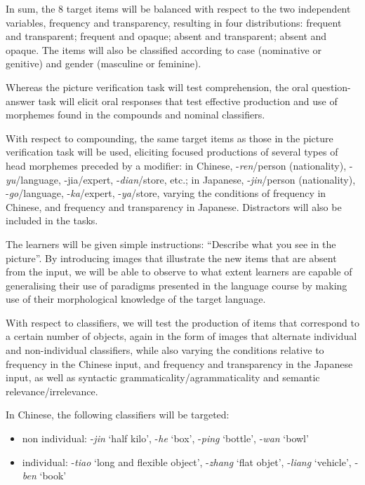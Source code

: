 \documentclass[output=paper,colorlinks,citecolor=brown,modfonts,nonflat]{../langscibook}
\begin{document}
In sum, the 8 target items will be balanced with respect to the two independent variables, frequency and transparency, resulting in four distributions: frequent and transparent; frequent and opaque; absent and transparent; absent and opaque. The items will also be classified according to case (nominative or genitive) and gender (masculine or feminine). 

\label{sec:watorek:4.2.3.2}

Whereas the picture verification task will test comprehension, the oral question-answer task will elicit oral responses that test effective production and use of morphemes found in the compounds and nominal classifiers. 

With respect to compounding, the same target items as those in the picture verification task will be used, eliciting focused productions of several types of head morphemes preceded by a modifier: in Chinese, -\textit{ren}/person (nationality), -\textit{yu}/language, -jia/expert, -\textit{dian}/store, etc.; in Japanese, -\textit{jin}/person (nationality), -\textit{go}/language, -\textit{ka}/expert, -\textit{ya}/store, varying the conditions of frequency in Chinese, and frequency and transparency in Japanese. Distractors will also be included in the tasks.

The learners will be given simple instructions: “Describe what you see in the picture”. By introducing images that illustrate the new items that are absent from the input, we will be able to observe to what extent learners are capable of generalising their use of paradigms presented in the language course by making use of their morphological knowledge of the target language. 

With respect to classifiers, we will test the production of items that correspond to a certain number of objects, again in the form of images that alternate individual and non-individual classifiers, while also varying the conditions relative to frequency in the Chinese input, and frequency and transparency in the Japanese input, as well as syntactic grammaticality/agrammaticality and semantic relevance/irrelevance.

In Chinese, the following classifiers will be targeted:
\begin{itemize}
  \item  non individual: -\textit{jin} `half kilo', -\textit{he} `box', -\textit{ping} `bottle', -\textit{wan} `bowl'

  \item individual: -\textit{tiao} `long and flexible object', -\textit{zhang} `flat objet', -\textit{liang} `vehicle', -\textit{ben} `book'
\end{itemize}
\end{document}
